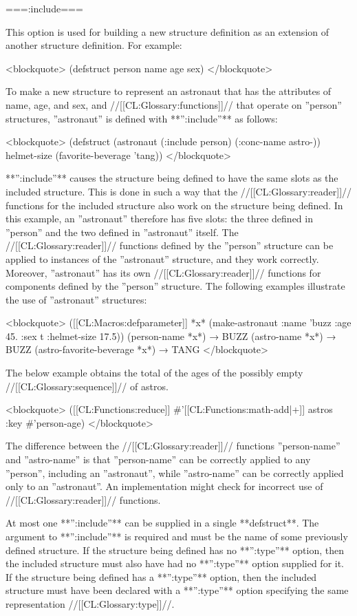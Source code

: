 ===:include===

This option is used for building a new structure definition as an extension of another structure definition. For example:

<blockquote> (defstruct person name age sex) </blockquote> 

To make a new structure to represent an astronaut that has the attributes of name, age, and sex, and //[[CL:Glossary:functions]]// that operate on ''person'' structures, ''astronaut'' is defined with **'':include''** as follows:

<blockquote> 
(defstruct (astronaut (:include person) 
                      (:conc-name astro-)) 
  helmet-size 
  (favorite-beverage 'tang))
</blockquote>

**'':include''** causes the structure being defined to have the same slots as the included structure. This is done in such a way that the //[[CL:Glossary:reader]]// functions for the included structure also work on the structure being defined. In this example, an ''astronaut'' therefore has five slots: the three defined in ''person'' and the two defined in ''astronaut'' itself. The //[[CL:Glossary:reader]]// functions defined by the ''person'' structure can be applied to instances of the ''astronaut'' structure, and they work correctly. Moreover, ''astronaut'' has its own //[[CL:Glossary:reader]]// functions for components defined by the ''person'' structure. The following examples illustrate the use of ''astronaut'' structures:

<blockquote> 
([[CL:Macros:defparameter]] *x* 
  (make-astronaut :name 'buzz 
                  :age 45. 
                  :sex t 
                  :helmet-size 17.5))
(person-name *x*) → BUZZ 
(astro-name *x*) → BUZZ 
(astro-favorite-beverage *x*) → TANG
</blockquote>

The below example obtains the total of the ages of the possibly empty //[[CL:Glossary:sequence]]// of astros.

<blockquote> 
([[CL:Functions:reduce]] #'[[CL:Functions:math-add|+]] astros :key #'person-age) 
</blockquote>

The difference between the //[[CL:Glossary:reader]]// functions ''person-name'' and ''astro-name'' is that ''person-name'' can be correctly applied to any ''person'', including an ''astronaut'', while ''astro-name'' can be correctly applied only to an ''astronaut''. An implementation might check for incorrect use of //[[CL:Glossary:reader]]// functions.

At most one **'':include''** can be supplied in a single **defstruct**. The argument to **'':include''** is required and must be the name of some previously defined structure. If the structure being defined has no **'':type''** option, then the included structure must also have had no **'':type''** option supplied for it. If the structure being defined has a **'':type''** option, then the included structure must have been declared with a **'':type''** option specifying the same representation //[[CL:Glossary:type]]//.

